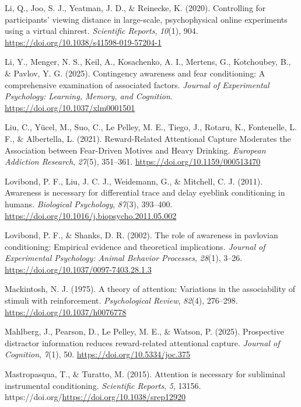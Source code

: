 \documentclass[
  man,
  floatsintext,
  longtable,
  nolmodern,
  notxfonts,
  notimes,
  mask,
  colorlinks=true,linkcolor=blue,citecolor=blue,urlcolor=blue]{apa7}
\newlength{\cslhangindent}
\newenvironment{CSLReferences}[2] %
 {\begin{list}{}{%
  \setlength{\itemindent}{0pt}
  \setlength{\leftmargin}{0pt}
  \setlength{\parsep}{0pt}
  \ifodd #1
   \setlength{\leftmargin}{\cslhangindent}
   \setlength{\itemindent}{-1\cslhangindent}
  \fi
  \setlength{\itemsep}{#2\baselineskip}}}
 {\end{list}}
\begin{document}
\begin{CSLReferences}{1}{0}
Li, Q., Joo, S. J., Yeatman, J. D., \& Reinecke, K. (2020). Controlling
for participants{'} viewing distance in large-scale, psychophysical
online experiments using a virtual chinrest. \emph{Scientific Reports},
\emph{10}(1), 904. \url{https://doi.org/10.1038/s41598-019-57204-1}

Li, Y., Menger, N. S., Keil, A., Kosachenko, A. I., Mertens, G.,
Kotchoubey, B., \& Pavlov, Y. G. (2025). Contingency awareness and fear
conditioning: {A} comprehensive examination of associated factors.
\emph{Journal of Experimental Psychology: Learning, Memory, and
Cognition}. \url{https://doi.org/10.1037/xlm0001501}

Liu, C., Yücel, M., Suo, C., Le Pelley, M. E., Tiego, J., Rotaru, K.,
Fontenelle, L. F., \& Albertella, L. (2021). Reward-Related Attentional
Capture Moderates the Association between Fear-Driven Motives and Heavy
Drinking. \emph{European Addiction Research}, \emph{27}(5), 351--361.
\url{https://doi.org/10.1159/000513470}

Lovibond, P. F., Liu, J. C. J., Weidemann, G., \& Mitchell, C. J.
(2011). Awareness is necessary for differential trace and delay eyeblink
conditioning in humans. \emph{Biological Psychology}, \emph{87}(3),
393--400. \url{https://doi.org/10.1016/j.biopsycho.2011.05.002}

Lovibond, P. F., \& Shanks, D. R. (2002). The role of awareness in
pavlovian conditioning: Empirical evidence and theoretical implications.
\emph{Journal of Experimental Psychology: Animal Behavior Processes},
\emph{28}(1), 3--26. \url{https://doi.org/10.1037/0097-7403.28.1.3}

Mackintosh, N. J. (1975). A theory of attention: Variations in the
associability of stimuli with reinforcement. \emph{Psychological
Review}, \emph{82}(4), 276--298. \url{https://doi.org/10.1037/h0076778}

Mahlberg, J., Pearson, D., Le Pelley, M. E., \& Watson, P. (2025).
Prospective distractor information reduces reward-related attentional
capture. \emph{Journal of Cognition}, \emph{7}(1), 50.
\url{https://doi.org/10.5334/joc.375}

Mastropasqua, T., \& Turatto, M. (2015). Attention is necessary for
subliminal instrumental conditioning. \emph{Scientific Reports},
\emph{5}, 13156. https://doi.org/\url{https://doi.org/10.1038/srep12920}


\end{CSLReferences}
\end{document}
